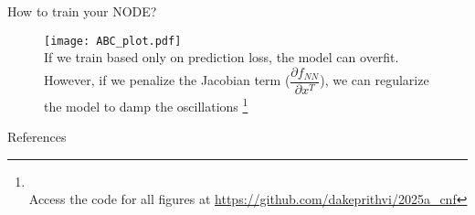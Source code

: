 \documentclass[dvipsnames, 9pt]{beamer}
\begin{document}
\begin{frame}{How to train your NODE?}
    
\begin{figure}[h]
    \centering
    \texttt{[image: ABC\_plot.pdf]}  \\
    If we train based only on prediction loss, the model can overfit.
    However, if we penalize the Jacobian term ($\dfrac{\partial f_{NN}}{\partial x^T}$), we can regularize the model
    to damp the oscillations \footnote{\cite{finlay:jacobsen:nurbekyan:oberman:2020} \\ 
    Access the code for all figures at \url{https://github.com/dakeprithvi/2025a_cnf}}
    \end{figure}
\end{frame}

\begin{frame}[allowframebreaks]{References}
	\renewcommand{\refname}{}
	
	
\end{frame}
\end{document}
